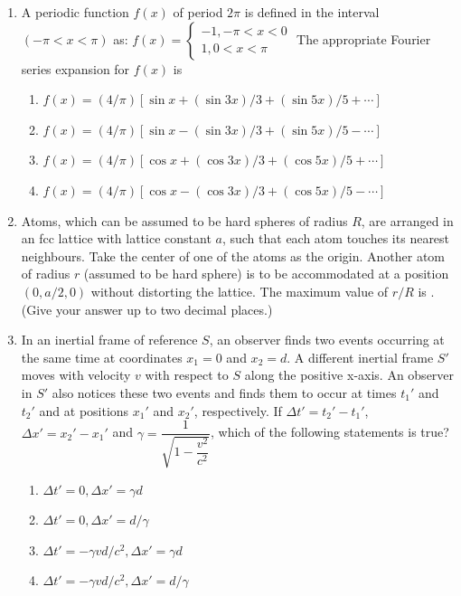 \documentclass[journal,12pt,onecolumn]{IEEEtran}
\theoremstyle{remark}
\begin{document}
\begin{enumerate}
\item A periodic function $f(x)$ of period $2\pi$ is defined in the interval $(-\pi < x < \pi)$ as:
$
f(x) =
\begin{cases}
-1, -\pi < x < 0 \\
1,  0 < x < \pi
\end{cases}
$
The appropriate Fourier series expansion for $f(x)$ is


\begin{enumerate}
    \item $f(x) = (4/\pi)[\sin x + (\sin 3x)/3 + (\sin 5x)/5 + \cdots ]$
    \item $f(x) = (4/\pi)[\sin x - (\sin 3x)/3 + (\sin 5x)/5 - \cdots ]$
    \item $f(x) = (4/\pi)[\cos x + (\cos 3x)/3 + (\cos 5x)/5 + \cdots ]$
    \item $f(x) = (4/\pi)[\cos x - (\cos 3x)/3 + (\cos 5x)/5 - \cdots ]$
\end{enumerate}


\item Atoms, which can be assumed to be hard spheres of radius $R$, are arranged in an fcc lattice with lattice constant $a$, such that each atom touches its nearest neighbours. Take the center of one of the atoms as the origin. Another atom of radius $r$ (assumed to be hard sphere) is to be accommodated at a position $(0, a/2, 0)$ without distorting the lattice. The maximum value of $r/R$ is \underline{\hspace{2cm}}. (Give your answer up to two decimal places.)

\item In an inertial frame of reference $S$, an observer finds two events occurring at the same time at coordinates $x_1 = 0$ and $x_2 = d$. A different inertial frame $S'$ moves with velocity $v$ with respect to $S$ along the positive x-axis. An observer in $S'$ also notices these two events and finds them to occur at times $t_1'$ and $t_2'$ and at positions $x_1'$ and $x_2'$, respectively. If $\Delta t' = t_2' - t_1'$, $\Delta x' = x_2' - x_1'$ and $\gamma = \dfrac{1}{\sqrt{1-\dfrac{v^2}{c^2}}}$, which of the following statements is true?

\begin{multicols}{2}
\begin{enumerate}
    \item $\Delta t' = 0, \Delta x' = \gamma d$
    \item $\Delta t' = 0, \Delta x' = d/\gamma$
    \item $\Delta t' = -\gamma v d / c^2, \Delta x' = \gamma d$
    \item $\Delta t' = -\gamma v d / c^2, \Delta x' = d/\gamma$
\end{enumerate}
\end{multicols}


\end{enumerate}
\end{document}
